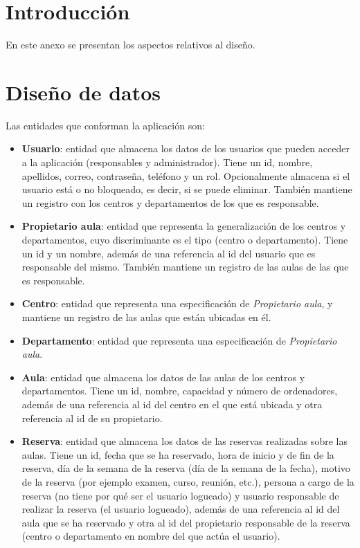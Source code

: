
\section{Introducción}
En este anexo se presentan los aspectos relativos al diseño.

\section{Diseño de datos}
Las entidades que conforman la aplicación son:

\begin{itemize}
    \item \textbf{Usuario}: entidad que almacena los datos de los usuarios que pueden acceder a la aplicación (responsables y administrador). Tiene un id, nombre, apellidos, correo, contraseña, teléfono y un rol. Opcionalmente almacena si el usuario está o no bloqueado, es decir, si se puede eliminar. También mantiene un registro con los centros y departamentos de los que es responsable.
    
    \item \textbf{Propietario aula}: entidad que representa la generalización de los centros y departamentos, cuyo discriminante es el tipo (centro o departamento). Tiene un id y un nombre, además de una referencia al id del usuario que es responsable del mismo. También mantiene un registro de las aulas de las que es responsable.
    
    \item \textbf{Centro}: entidad que representa una especificación de \textit{Propietario aula}, y mantiene un registro de las aulas que están ubicadas en él.
    
    \item \textbf{Departamento}: entidad que representa una especificación de \textit{Propietario aula}.
    
    \item \textbf{Aula}: entidad que almacena los datos de las aulas de los centros y departamentos. Tiene un id, nombre, capacidad y número de ordenadores, además de una referencia al id del centro en el que está ubicada y otra referencia al id de su propietario.
    
    \item \textbf{Reserva}: entidad que almacena los datos de las reservas realizadas sobre las aulas. Tiene un id, fecha que se ha reservado, hora de inicio y de fin de la reserva, día de la semana de la reserva (día de la semana de la fecha), motivo de la reserva (por ejemplo examen, curso, reunión, etc.), persona a cargo de la reserva (no tiene por qué ser el usuario logueado) y usuario responsable de realizar la reserva (el usuario logueado), además de una referencia al id del aula que se ha reservado y otra al id del propietario responsable de la reserva (centro o departamento en nombre del que actúa el usuario). 
    

\end{itemize}
